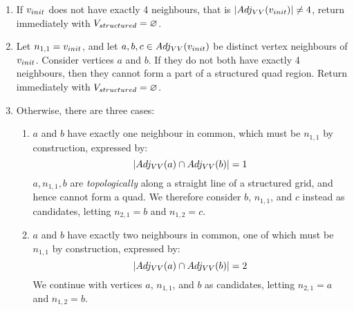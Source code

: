 \begin{enumerate}
\item If $v_{init}$ does not have exactly 4 neighbours, that is $ \left\vert{Adj_{VV}(v_{init})}\right\vert \neq 4 $, return immediately with $V_{structured} = \varnothing$.
\item Let $ n_{1,1} = v_{init} $, and let $ a, b, c \in Adj_{VV}(v_{init}) $ be distinct vertex neighbours of $v_{init}$. Consider vertices $a$ and $b$. If they do not both have exactly 4 neighbours, then they cannot form a part of a structured quad region. Return immediately with $V_{structured} = \varnothing$.

\item Otherwise, there are three cases:

	\begin{enumerate}

	\item $a$ and $b$ have exactly one neighbour in common, which must be $n_{1,1}$ by construction, expressed by:
	$$ \left\vert{Adj_{VV}(a) \cap Adj_{VV}(b)}\right\vert = 1$$
	$a, n_{1,1}, b $ are \emph{topologically} along a straight line of a structured grid, and hence cannot form a quad.
	We therefore consider $b$, $n_{1,1}$, and  $c$ instead as candidates, letting $n_{2,1} = b$ and $n_{1,2} = c$.


	\item $a$ and $b$ have exactly two neighbours in common, one of which must be $n_{1,1}$ by construction, expressed by:
	$$ \left\vert{Adj_{VV}(a) \cap Adj_{VV}(b)}\right\vert = 2$$
	We continue with vertices $a$, $n_{1,1}$, and $b$ as candidates, letting $n_{2,1} = a$ and $n_{1,2} = b$.
\end{enumerate}
\end{enumerate}
